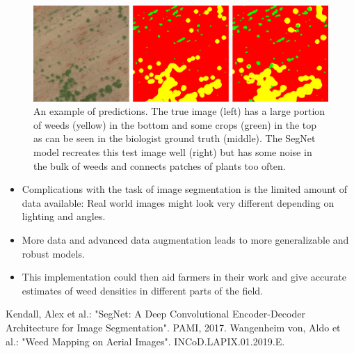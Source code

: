 \documentclass[
    ,title     = {{Image Segmentation for Smart Agriculture}}
    ,subject   = {{This is the subject of my work}}
    ,papersize = {{a1paper}}
    ,nocrop
]{dtuposter}
\begin{document}
\begin{dtupostercontent}
\begin{figure}
	\begin{center}
			\includegraphics[width=\linewidth,origin=c]{reconst}
	\end{center}
	\caption{An example of predictions. The true image (left) has a large portion of weeds (yellow) in the bottom and some crops (green) in the top as can be seen in the biologist ground truth (middle). The SegNet model recreates this test image well (right) but has some noise in the bulk of weeds and connects patches of plants too often. }
\end{figure}

\begin{itemize}
	\item Complications with the task of image segmentation is the limited amount of data available: Real world images might look very different depending on lighting and angles.
	\item More data and advanced data augmentation leads to more generalizable and robust models.
	\item This implementation could then aid farmers in their work and give accurate estimates of weed densities in different parts of the field.
\end{itemize}

\begin{thebibliography}{9}
	 Kendall, Alex et al.: "SegNet: A Deep Convolutional Encoder-Decoder Architecture for Image Segmentation". PAMI, 2017.
	 Wangenheim von, Aldo et al.: "Weed Mapping on Aerial Images". INCoD.LAPIX.01.2019.E.
\end{thebibliography}
\end{dtupostercontent}
\end{document}
